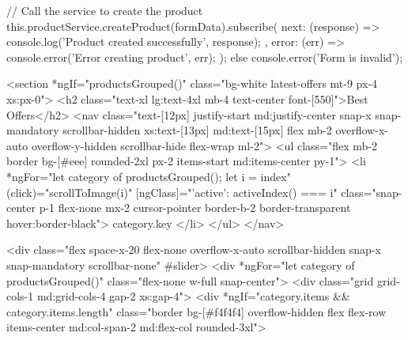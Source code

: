 {{{      // Call the service to create the product
      this.productService.createProduct(formData).subscribe({
        next: (response) => {
          console.log('Product created successfully', response);
        },
        error: (err) => {
          console.error('Error creating product', err);
        }
      });
    } else {
      console.error('Form is invalid');
    }
  }
}





















































<section *ngIf="productsGrouped()" class="bg-white latest-offers mt-9 px-4 xs:px-0">
  <h2 class="text-xl lg:text-4xl mb-4 text-center font-[550]">Best Offers</h2>
  <nav
    class="text-[12px] justify-start md:justify-center snap-x snap-mandatory scrollbar-hidden xs:text-[13px] md:text-[15px] flex mb-2 overflow-x-auto overflow-y-hidden scrollbar-hide flex-wrap ml-2">
    <ul class="flex mb-2 border bg-[#eee] rounded-2xl px-2 items-start md:items-center py-1">
      <li *ngFor="let category of productsGrouped(); let i = index" (click)="scrollToImage(i)"
        [ngClass]="{'active': activeIndex() === i}"
        class="snap-center p-1 flex-none mx-2 cursor-pointer border-b-2 border-transparent hover:border-black">
        {{ category.key }}
      </li>
    </ul>
  </nav>

  <div class="flex space-x-20 flex-none overflow-x-auto scrollbar-hidden snap-x snap-mandatory scrollbar-none" #slider>
    <div *ngFor="let category of productsGrouped()" class="flex-none w-full snap-center">
      <div class="grid grid-cols-1 md:grid-cols-4 gap-2 xs:gap-4">
        <div *ngIf="category.items && category.items.length"
          class="border bg-[#f4f4f4] 
          overflow-hidden flex 
          flex-row items-center
          md:col-span-2 md:flex-col rounded-3xl">
        
